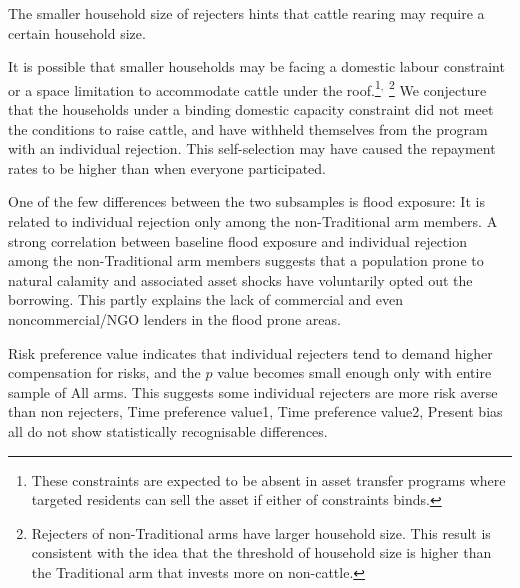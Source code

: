 	The smaller household size of rejecters hints that cattle rearing may require a certain household size. %

	It is possible that smaller households may be facing a domestic labour constraint or a space limitation to accommodate cattle under the roof.\footnote{These constraints are expected to be absent in asset transfer programs where targeted residents can sell the asset if either of constraints binds. }$^{,}$ \footnote{Rejecters of non-\textsf{Traditional} arms have larger household size. This result is consistent with the idea that the threshold of household size is higher than the \textsf{Traditional} arm that invests more on non-cattle. } We conjecture that the households under a binding domestic capacity constraint did not meet the conditions to raise cattle, and have withheld themselves from the program with an individual rejection. This self-selection may have caused the repayment rates to be higher than when everyone participated. 

	One of the few differences between the two subsamples is flood exposure: It is related to individual rejection only among the non-\textsf{Traditional} arm members. %
	A strong correlation between baseline flood exposure and individual rejection among the non-\textsf{Traditional} arm members suggests that a population prone to natural calamity and associated asset shocks have voluntarily opted out the borrowing. This partly explains the lack of commercial and even noncommercial/NGO lenders in the flood prone areas. 
	
	\textsf{Risk preference value} indicates that individual rejecters tend to demand higher compensation for risks, and the $p$ value becomes small enough only with entire sample of \textsf{All arms}. This suggests some individual rejecters are more risk averse than non rejecters,  \textsf{Time preference value1, Time preference value2, Present bias} all do not show statistically recognisable differences. 

